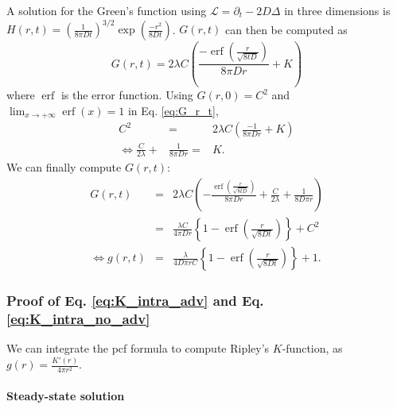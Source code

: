 \documentclass[12pt,english]{article}
\DeclareMathOperator\erf{erf}
\begin{document}
A solution for the Green's function using $\mathcal{L}=\partial_{t}-2D\Delta$
in three dimensions is $H(r,t)=\left(\frac{1}{8\pi Dt}\right)^{3/2}\exp(\frac{-r^{2}}{8Dt})$.
$G(r,t)$ can then be computed as 
\begin{equation}
G(r,t)=2\lambda C\left(\frac{-\erf\left(\frac{r}{\sqrt{8tD}}\right)}{8\pi Dr}+K\right)\label{eq:G_r_t}
\end{equation}
where $\erf$ is the error function. Using $G(r,0)=C^{2}$ and $\lim_{x\rightarrow+\infty}\erf(x)=1$
in Eq. \ref{eq:G_r_t}, 
\begin{equation}
\begin{array}{ccc}
C^{2} & = & 2\lambda C\left(\frac{-1}{8\pi Dr}+K\right)\\
\Leftrightarrow\frac{C}{2\lambda}+ & \frac{1}{8\pi Dr}= & K.
\end{array}
\end{equation}
We can finally compute $G(r,t)$: 
\begin{equation}
\begin{array}{ccc}
G(r,t) & = & 2\lambda C\left(-\frac{\erf\left(\frac{r}{\sqrt{8tD}}\right)}{8\pi Dr}+\frac{C}{2\lambda}+\frac{1}{8D\pi r}\right)\\
 & = & \frac{\lambda C}{4\pi Dr}\left\{ 1-\erf\left(\frac{r}{\sqrt{8Dt}}\right)\right\} +C^{2}\\
\Leftrightarrow g(r,t) & = & \frac{\lambda}{4D\pi rC}\left\{ 1-\erf\left(\frac{r}{\sqrt{8Dt}}\right)\right\} +1.
\end{array}\label{eq:pcf_noadv_bbm}
\end{equation}


\subsubsection*{Proof of Eq. \ref{eq:K_intra_adv} and Eq. \ref{eq:K_intra_no_adv}}

We can integrate the pcf formula to compute Ripley's $K$-function,
as $g(r)=\frac{K'(r)}{4\pi r^{2}}$.

\paragraph{Steady-state solution}
\end{document}
